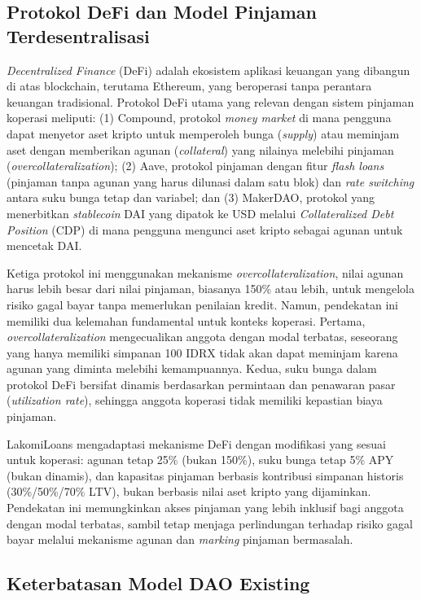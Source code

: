 \subsection{Protokol DeFi dan Model Pinjaman Terdesentralisasi}

\textit{Decentralized Finance} (DeFi) adalah ekosistem aplikasi keuangan yang dibangun di atas blockchain, terutama Ethereum, yang beroperasi tanpa perantara keuangan tradisional. Protokol DeFi utama yang relevan dengan sistem pinjaman koperasi meliputi: (1) Compound, protokol \textit{money market} di mana pengguna dapat menyetor aset kripto untuk memperoleh bunga (\textit{supply}) atau meminjam aset dengan memberikan agunan (\textit{collateral}) yang nilainya melebihi pinjaman (\textit{overcollateralization}); (2) Aave, protokol pinjaman dengan fitur \textit{flash loans} (pinjaman tanpa agunan yang harus dilunasi dalam satu blok) dan \textit{rate switching} antara suku bunga tetap dan variabel; dan (3) MakerDAO, protokol yang menerbitkan \textit{stablecoin} DAI yang dipatok ke USD melalui \textit{Collateralized Debt Position} (CDP) di mana pengguna mengunci aset kripto sebagai agunan untuk mencetak DAI.

Ketiga protokol ini menggunakan mekanisme \textit{overcollateralization}, nilai agunan harus lebih besar dari nilai pinjaman, biasanya 150\% atau lebih, untuk mengelola risiko gagal bayar tanpa memerlukan penilaian kredit. Namun, pendekatan ini memiliki dua kelemahan fundamental untuk konteks koperasi. Pertama, \textit{overcollateralization} mengecualikan anggota dengan modal terbatas, seseorang yang hanya memiliki simpanan 100 IDRX tidak akan dapat meminjam karena agunan yang diminta melebihi kemampuannya. Kedua, suku bunga dalam protokol DeFi bersifat dinamis berdasarkan permintaan dan penawaran pasar (\textit{utilization rate}), sehingga anggota koperasi tidak memiliki kepastian biaya pinjaman.

LakomiLoans mengadaptasi mekanisme DeFi dengan modifikasi yang sesuai untuk koperasi: agunan tetap 25\% (bukan 150\%), suku bunga tetap 5\% APY (bukan dinamis), dan kapasitas pinjaman berbasis kontribusi simpanan historis (30\%/50\%/70\% LTV), bukan berbasis nilai aset kripto yang dijaminkan. Pendekatan ini memungkinkan akses pinjaman yang lebih inklusif bagi anggota dengan modal terbatas, sambil tetap menjaga perlindungan terhadap risiko gagal bayar melalui mekanisme agunan dan \textit{marking} pinjaman bermasalah.

\subsection{Keterbatasan Model DAO Existing}

